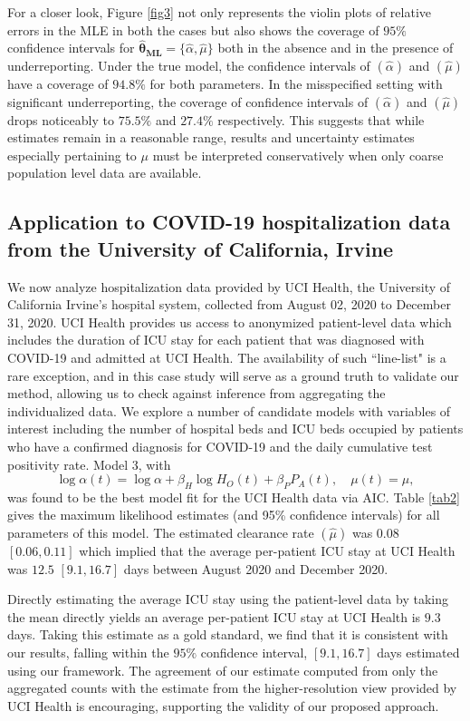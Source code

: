 \documentclass{article}
\begin{document}
For a closer look, Figure \ref{fig3} not only represents the violin plots of relative errors in the MLE in both the cases but also shows the coverage of $95\%$ confidence intervals for $\pmb{\hat{\theta}_{ML}} = \{\hat{\alpha}, \hat{\mu}\}$ both in the absence and in the presence of underreporting. Under the true model, the confidence intervals of $(\hat{\alpha})$ and $(\hat{\mu})$ have a coverage of $94.8 \%$ for both parameters. In the misspecified setting with significant underreporting, the coverage of confidence intervals of $(\hat{\alpha})$ and $(\hat{\mu})$ drops noticeably to $75.5 \%$ and $27.4 \%$ respectively. This suggests that while estimates remain in a reasonable range, results and uncertainty estimates especially pertaining to $\mu$ must be interpreted conservatively when only coarse population level data are available.

\subsection{Application to COVID-19 hospitalization data from the University of California, Irvine}
\label{University of California, Irvine}

We now analyze hospitalization data provided by UCI Health, the University of California Irvine's hospital system, collected from August 02, 2020 to December 31, 2020. UCI Health provides us access to anonymized patient-level data which includes the duration of ICU stay for each patient that was diagnosed with COVID-19 and admitted at UCI Health. The availability of such ``line-list" is a rare exception, and in this case study will serve as a ground truth to validate our method, allowing us to check against inference from aggregating the individualized data.  We explore a number of candidate models with variables of interest including the number of hospital beds and ICU beds occupied by patients who have a confirmed diagnosis for COVID-19 and the daily cumulative test positivity rate. Model 3, with
$$\log{\alpha(t)} = \log{\alpha} + \beta_{H} \log{H_{O}(t)} + \beta_{P}P_{A}(t), \quad \mu(t) = \mu,$$
was found to be the best model fit for the UCI Health data via AIC. Table \ref{tab2} gives the maximum likelihood estimates (and 95\% confidence intervals) for all parameters of this model. The estimated clearance rate $(\hat{\mu})$ was $0.08$ $[0.06, 0.11]$ which implied that the average per-patient ICU stay at UCI Health was $12.5$ $[9.1, 16.7]$ days between August 2020 and December 2020. \par
Directly estimating the average ICU stay using the patient-level data by taking the mean directly yields an average per-patient ICU stay at UCI Health is $9.3$ days. Taking this estimate as a gold standard, we find that it is consistent with our results, falling within the $95\%$ confidence interval, $[9.1, 16.7]$ days estimated using our framework. The agreement of our estimate computed from only the aggregated counts with the estimate from the higher-resolution view provided by UCI Health is encouraging, supporting the validity of our proposed approach.
\end{document}

